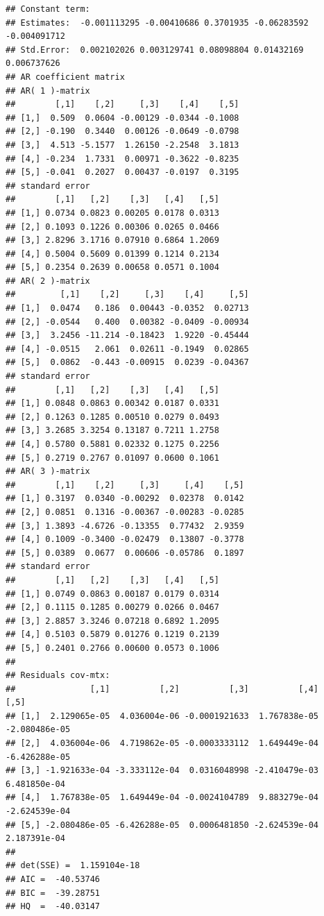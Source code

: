 \documentclass[12pt,a4paper]{article}
\begin{document}
\begin{verbatim}
## Constant term: 
## Estimates:  -0.001113295 -0.00410686 0.3701935 -0.06283592 -0.004091712 
## Std.Error:  0.002102026 0.003129741 0.08098804 0.01432169 0.006737626 
## AR coefficient matrix 
## AR( 1 )-matrix 
##        [,1]    [,2]     [,3]    [,4]    [,5]
## [1,]  0.509  0.0604 -0.00129 -0.0344 -0.1008
## [2,] -0.190  0.3440  0.00126 -0.0649 -0.0798
## [3,]  4.513 -5.1577  1.26150 -2.2548  3.1813
## [4,] -0.234  1.7331  0.00971 -0.3622 -0.8235
## [5,] -0.041  0.2027  0.00437 -0.0197  0.3195
## standard error 
##        [,1]   [,2]    [,3]   [,4]   [,5]
## [1,] 0.0734 0.0823 0.00205 0.0178 0.0313
## [2,] 0.1093 0.1226 0.00306 0.0265 0.0466
## [3,] 2.8296 3.1716 0.07910 0.6864 1.2069
## [4,] 0.5004 0.5609 0.01399 0.1214 0.2134
## [5,] 0.2354 0.2639 0.00658 0.0571 0.1004
## AR( 2 )-matrix 
##         [,1]    [,2]     [,3]    [,4]     [,5]
## [1,]  0.0474   0.186  0.00443 -0.0352  0.02713
## [2,] -0.0544   0.400  0.00382 -0.0409 -0.00934
## [3,]  3.2456 -11.214 -0.18423  1.9220 -0.45444
## [4,] -0.0515   2.061  0.02611 -0.1949  0.02865
## [5,]  0.0862  -0.443 -0.00915  0.0239 -0.04367
## standard error 
##        [,1]   [,2]    [,3]   [,4]   [,5]
## [1,] 0.0848 0.0863 0.00342 0.0187 0.0331
## [2,] 0.1263 0.1285 0.00510 0.0279 0.0493
## [3,] 3.2685 3.3254 0.13187 0.7211 1.2758
## [4,] 0.5780 0.5881 0.02332 0.1275 0.2256
## [5,] 0.2719 0.2767 0.01097 0.0600 0.1061
## AR( 3 )-matrix 
##        [,1]    [,2]     [,3]     [,4]    [,5]
## [1,] 0.3197  0.0340 -0.00292  0.02378  0.0142
## [2,] 0.0851  0.1316 -0.00367 -0.00283 -0.0285
## [3,] 1.3893 -4.6726 -0.13355  0.77432  2.9359
## [4,] 0.1009 -0.3400 -0.02479  0.13807 -0.3778
## [5,] 0.0389  0.0677  0.00606 -0.05786  0.1897
## standard error 
##        [,1]   [,2]    [,3]   [,4]   [,5]
## [1,] 0.0749 0.0863 0.00187 0.0179 0.0314
## [2,] 0.1115 0.1285 0.00279 0.0266 0.0467
## [3,] 2.8857 3.3246 0.07218 0.6892 1.2095
## [4,] 0.5103 0.5879 0.01276 0.1219 0.2139
## [5,] 0.2401 0.2766 0.00600 0.0573 0.1006
##   
## Residuals cov-mtx: 
##               [,1]          [,2]          [,3]          [,4]          [,5]
## [1,]  2.129065e-05  4.036004e-06 -0.0001921633  1.767838e-05 -2.080486e-05
## [2,]  4.036004e-06  4.719862e-05 -0.0003333112  1.649449e-04 -6.426288e-05
## [3,] -1.921633e-04 -3.333112e-04  0.0316048998 -2.410479e-03  6.481850e-04
## [4,]  1.767838e-05  1.649449e-04 -0.0024104789  9.883279e-04 -2.624539e-04
## [5,] -2.080486e-05 -6.426288e-05  0.0006481850 -2.624539e-04  2.187391e-04
##   
## det(SSE) =  1.159104e-18 
## AIC =  -40.53746 
## BIC =  -39.28751 
## HQ  =  -40.03147
\end{verbatim}
\end{document}
